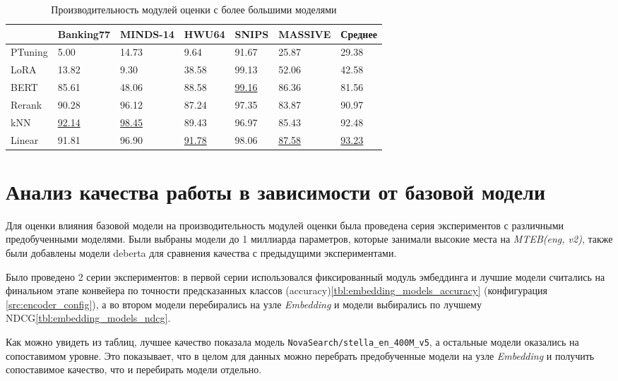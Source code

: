 \documentclass[14pt,a4paper,oneside,openany]{extbook}
\begin{document}
\begin{table}[h!]
\caption{\label{tbl:heavy_modules}Производительность модулей оценки с более большими моделями}
\centering
\begin{tabular}{|p{2cm}|p{2cm}|p{2cm}|p{2cm}|p{2cm}|p{2cm}|p{2cm}|}
\hline
 & Banking77 & MINDS-14 & HWU64 & SNIPS & MASSIVE & Среднее\\
\hline
PTuning & 5.00 & 14.73 & 9.64 & 91.67 & 25.87 & 29.38\\
\hline
LoRA & 13.82 & 9.30 & 38.58 & 99.13 & 52.06 & 42.58\\
\hline
BERT & 85.61 & 48.06 & 88.58 & \uline{99.16} & 86.36 & 81.56\\
\hline
Rerank & 90.28 & 96.12 & 87.24 & 97.35 & 83.87 & 90.97\\
\hline
kNN & \uline{92.14} & \uline{98.45} & 89.43 & 96.97 & 85.43 & 92.48\\
\hline
Linear & 91.81 & 96.90 & \uline{91.78} & 98.06 & \uline{87.58} & \uline{93.23}\\
\hline
\end{tabular}
\end{table}
\section{Анализ качества работы в зависимости от базовой модели}
\label{sec:orga25ad68}
Для оценки влияния базовой модели на производительность модулей оценки была проведена серия экспериментов с различными предобученными моделями. Были выбраны модели до 1 миллиарда параметров, которые занимали высокие места на \emph{MTEB(eng, v2)}\autocites{muennighoff_mteb_2023}[][]{enevoldsen_mmteb_2025}, также были добавлены модели deberta для сравнения качества с предыдущими экспериментами.

Было проведено 2 серии экспериментов: в первой серии использовался фиксированный модуль эмбеддинга и лучшие модели считались на финальном этапе конвейера по точности предсказанных классов (accuracy)\ref{tbl:embedding_models_accuracy} (конфигурация \ref{src:encoder_config}), а во втором модели перебирались на узле \emph{Embedding} и модели выбирались по лучшему NDCG\ref{tbl:embedding_models_ndcg}.

Как можно увидеть из таблиц, лучшее качество показала модель \texttt{NovaSearch/stella\_en\_400M\_v5}\autocite{zhang_jasper_2025}, а остальные модели оказались на сопоставимом уровне. Это показывает, что в целом для данных можно перебрать предобученные модели на узле \emph{Embedding} и получить сопоставимое качество, что и перебирать модели отдельно.
\end{document}
